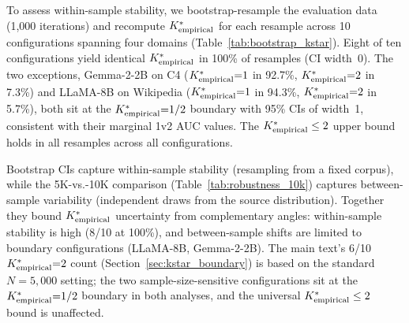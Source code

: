To assess within-sample stability, we bootstrap-resample the evaluation data (1{,}000 iterations) and recompute ${K^*_{\text{empirical}}}$ for each resample across 10 configurations spanning four domains (Table~\ref{tab:bootstrap_kstar}).
Eight of ten configurations yield identical ${K^*_{\text{empirical}}}$ in 100\% of resamples (CI width~0).
The two exceptions, Gemma-2-2B on C4 (${K^*_{\text{empirical}}}{=}1$ in 92.7\%, ${K^*_{\text{empirical}}}{=}2$ in 7.3\%) and LLaMA-8B on Wikipedia (${K^*_{\text{empirical}}}{=}1$ in 94.3\%, ${K^*_{\text{empirical}}}{=}2$ in 5.7\%), both sit at the ${K^*_{\text{empirical}}}{=}1/2$ boundary with 95\% CIs of width~1, consistent with their marginal 1v2 AUC values.
The ${K^*_{\text{empirical}}} \leq 2$ upper bound holds in all resamples across all configurations.

Bootstrap CIs capture within-sample stability (resampling from a fixed corpus), while the 5K-vs.-10K comparison (Table~\ref{tab:robustness_10k}) captures between-sample variability (independent draws from the source distribution).
Together they bound ${K^*_{\text{empirical}}}$ uncertainty from complementary angles: within-sample stability is high (8/10 at 100\%), and between-sample shifts are limited to boundary configurations (LLaMA-8B, Gemma-2-2B).
The main text's 6/10 ${K^*_{\text{empirical}}}{=}2$ count (Section~\ref{sec:kstar_boundary}) is based on the standard $N{=}5{,}000$ setting; the two sample-size-sensitive configurations sit at the ${K^*_{\text{empirical}}}{=}1/2$ boundary in both analyses, and the universal ${K^*_{\text{empirical}}} \leq 2$ bound is unaffected.

